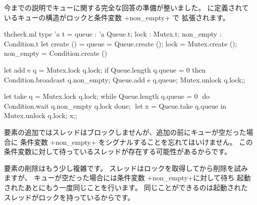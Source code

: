 今までの説明でキューに関する完全な回答の準備が整いました。
 に定義されているキューの構造がロックと条件変数 \ml+non_empty+ で
拡張されます。
%
\begin{listingcodefile}[style=numbers]{thcheck.ml}
type 'a t =
  { queue : 'a Queue.t; lock : Mutex.t; non_empty : Condition.t }
let create () =
  { queue = Queue.create ();
    lock = Mutex.create (); non_empty = Condition.create () }

let add e q =
  Mutex.lock q.lock;
  if Queue.length q.queue = 0 then Condition.broadcast q.non_empty;$\label{prog:broadcast}$
  Queue.add e q.queue;
  Mutex.unlock q.lock;;

let take q =
  Mutex.lock q.lock;
  while Queue.length q.queue = 0 $\label{prog:lock}$
  do Condition.wait q.non_empty q.lock done;  $\label{prog:slock}$
  let x = Queue.take q.queue in
  Mutex.unlock q.lock; x;;
\end{listingcodefile}
%
要素の追加ではスレッドはブロックしませんが、追加の前にキューが空だった場合に
条件変数 \ml+non_empty+ をシグナルすることを忘れてはいけません。
この条件変数に対して待っているスレッドが存在する可能性があるからです。

要素の削除はもう少し複雑です。
スレッドはロックを取得してから削除を試みますが、
キューが空だった場合には条件変数 \ml+non_empty+に対して待ち
起動されたあとにもう一度同じことを行います。
同じことができるのは起動されたスレッドがロックを持っているからです。

